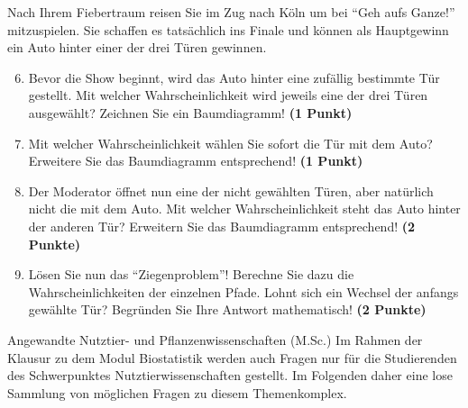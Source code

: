 \documentclass[a4paper, 9pt]{scrartcl}\usepackage[]{graphicx}\usepackage[]{xcolor}
\begin{document}
Nach Ihrem Fiebertraum reisen Sie im Zug nach K{\"o}ln um bei "`Geh aufs
Ganze!"' mitzuspielen. Sie schaffen es tats{\"a}chlich ins Finale und k{\"o}nnen
als Hauptgewinn ein Auto hinter einer der drei T{\"u}ren gewinnen. 

\begin{enumerate}
  \setcounter{enumi}{5}  
\item Bevor die Show beginnt, wird das Auto hinter eine zuf{\"a}llig bestimmte
  T{\"u}r gestellt. Mit welcher Wahrscheinlichkeit wird jeweils eine der drei
  T{\"u}ren ausgew{\"a}hlt? Zeichnen Sie ein Baumdiagramm! \textbf{(1 Punkt)}
\item Mit welcher Wahrscheinlichkeit w{\"a}hlen Sie sofort die T{\"u}r mit
  dem Auto? Erweitere Sie das Baumdiagramm entsprechend! \textbf{(1
    Punkt)}
\item Der Moderator {\"o}ffnet nun eine der nicht gew{\"a}hlten T{\"u}ren, aber
  nat{\"u}rlich nicht die mit dem Auto. Mit welcher Wahrscheinlichkeit steht
  das Auto hinter der anderen T{\"u}r? Erweitern Sie das Baumdiagramm
  entsprechend! \textbf{(2 Punkte)}
\item L{\"o}sen Sie nun das "`Ziegenproblem"'! Berechne Sie dazu die
  Wahrscheinlichkeiten der einzelnen Pfade. Lohnt sich ein Wechsel der
  anfangs gew{\"a}hlte T{\"u}r? Begr{\"u}nden Sie Ihre Antwort mathematisch!
  \textbf{(2 Punkte)}
\end{enumerate}
 






 
\clearpage
\begin{graybox}{Angewandte Nutztier- und Pflanzenwissenschaften (M.Sc.)}
  Im Rahmen der Klausur zu dem Modul Biostatistik werden auch Fragen
  nur für die Studierenden des Schwerpunktes Nutztierwissenschaften
  gestellt. Im Folgenden daher eine lose Sammlung von möglichen Fragen zu
  diesem Themenkomplex.
\end{graybox}
\clearpage
\end{document}
